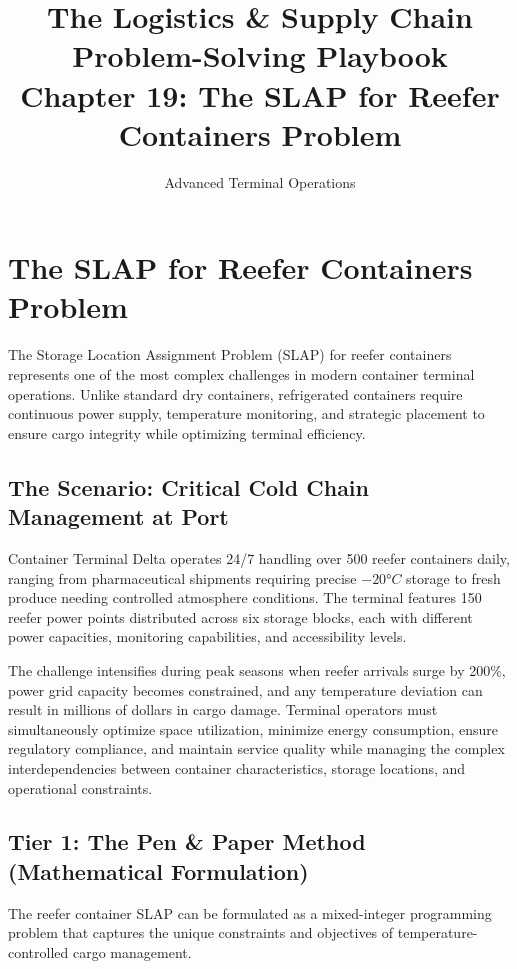 \documentclass{article}
\title{The Logistics \& Supply Chain Problem-Solving Playbook\\Chapter 19: The SLAP for Reefer Containers Problem}
\author{Advanced Terminal Operations}
\date{}
\begin{document}
\maketitle

\section{The SLAP for Reefer Containers Problem}

The Storage Location Assignment Problem (SLAP) for reefer containers represents one of the most complex challenges in modern container terminal operations. Unlike standard dry containers, refrigerated containers require continuous power supply, temperature monitoring, and strategic placement to ensure cargo integrity while optimizing terminal efficiency.

\subsection{The Scenario: Critical Cold Chain Management at Port}

Container Terminal Delta operates 24/7 handling over 500 reefer containers daily, ranging from pharmaceutical shipments requiring precise $-20°C$ storage to fresh produce needing controlled atmosphere conditions. The terminal features 150 reefer power points distributed across six storage blocks, each with different power capacities, monitoring capabilities, and accessibility levels.

The challenge intensifies during peak seasons when reefer arrivals surge by 200\%, power grid capacity becomes constrained, and any temperature deviation can result in millions of dollars in cargo damage. Terminal operators must simultaneously optimize space utilization, minimize energy consumption, ensure regulatory compliance, and maintain service quality while managing the complex interdependencies between container characteristics, storage locations, and operational constraints.

\subsection{Tier 1: The Pen \& Paper Method (Mathematical Formulation)}

The reefer container SLAP can be formulated as a mixed-integer programming problem that captures the unique constraints and objectives of temperature-controlled cargo management.
\end{document}
